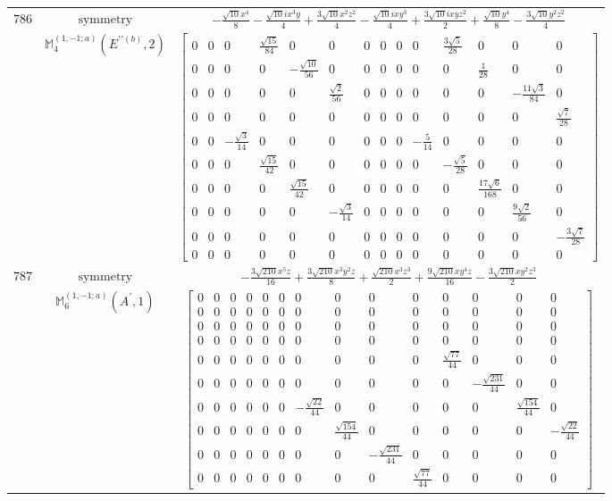 \documentclass[fleqn,8pt,landscape]{jsarticle}
\begin{document}
\begin{longtable}{ccc}
$ 786 $ & $ \text{symmetry} $ & $ - \frac{\sqrt{10} x^{4}}{8} - \frac{\sqrt{10} i x^{3} y}{4} + \frac{3 \sqrt{10} x^{2} z^{2}}{4} - \frac{\sqrt{10} i x y^{3}}{4} + \frac{3 \sqrt{10} i x y z^{2}}{2} + \frac{\sqrt{10} y^{4}}{8} - \frac{3 \sqrt{10} y^{2} z^{2}}{4} $ \\
$  $ & $ \mathbb{M}_{4}^{(1,-1;a)}(E^{\prime\prime(b)},2) $ & $ \begin{bmatrix} 0 & 0 & 0 & \frac{\sqrt{15}}{84} & 0 & 0 & 0 & 0 & 0 & 0 & \frac{3 \sqrt{5}}{28} & 0 & 0 & 0 \\ 0 & 0 & 0 & 0 & - \frac{\sqrt{10}}{56} & 0 & 0 & 0 & 0 & 0 & 0 & \frac{1}{28} & 0 & 0 \\ 0 & 0 & 0 & 0 & 0 & \frac{\sqrt{2}}{56} & 0 & 0 & 0 & 0 & 0 & 0 & - \frac{11 \sqrt{3}}{84} & 0 \\ 0 & 0 & 0 & 0 & 0 & 0 & 0 & 0 & 0 & 0 & 0 & 0 & 0 & \frac{\sqrt{7}}{28} \\ 0 & 0 & - \frac{\sqrt{3}}{14} & 0 & 0 & 0 & 0 & 0 & 0 & - \frac{5}{14} & 0 & 0 & 0 & 0 \\ 0 & 0 & 0 & \frac{\sqrt{15}}{42} & 0 & 0 & 0 & 0 & 0 & 0 & - \frac{\sqrt{5}}{28} & 0 & 0 & 0 \\ 0 & 0 & 0 & 0 & \frac{\sqrt{15}}{42} & 0 & 0 & 0 & 0 & 0 & 0 & \frac{17 \sqrt{6}}{168} & 0 & 0 \\ 0 & 0 & 0 & 0 & 0 & - \frac{\sqrt{3}}{14} & 0 & 0 & 0 & 0 & 0 & 0 & \frac{9 \sqrt{2}}{56} & 0 \\ 0 & 0 & 0 & 0 & 0 & 0 & 0 & 0 & 0 & 0 & 0 & 0 & 0 & - \frac{3 \sqrt{7}}{28} \\ 0 & 0 & 0 & 0 & 0 & 0 & 0 & 0 & 0 & 0 & 0 & 0 & 0 & 0 \end{bmatrix} $ \\ \hline
$ 787 $ & $ \text{symmetry} $ & $ - \frac{3 \sqrt{210} x^{5} z}{16} + \frac{3 \sqrt{210} x^{3} y^{2} z}{8} + \frac{\sqrt{210} x^{3} z^{3}}{2} + \frac{9 \sqrt{210} x y^{4} z}{16} - \frac{3 \sqrt{210} x y^{2} z^{3}}{2} $ \\
$  $ & $ \mathbb{M}_{6}^{(1,-1;a)}(A^{\prime},1) $ & $ \begin{bmatrix} 0 & 0 & 0 & 0 & 0 & 0 & 0 & 0 & 0 & 0 & 0 & 0 & 0 & 0 \\ 0 & 0 & 0 & 0 & 0 & 0 & 0 & 0 & 0 & 0 & 0 & 0 & 0 & 0 \\ 0 & 0 & 0 & 0 & 0 & 0 & 0 & 0 & 0 & 0 & 0 & 0 & 0 & 0 \\ 0 & 0 & 0 & 0 & 0 & 0 & 0 & 0 & 0 & 0 & 0 & 0 & 0 & 0 \\ 0 & 0 & 0 & 0 & 0 & 0 & 0 & 0 & 0 & 0 & \frac{\sqrt{77}}{44} & 0 & 0 & 0 \\ 0 & 0 & 0 & 0 & 0 & 0 & 0 & 0 & 0 & 0 & 0 & - \frac{\sqrt{231}}{44} & 0 & 0 \\ 0 & 0 & 0 & 0 & 0 & 0 & - \frac{\sqrt{22}}{44} & 0 & 0 & 0 & 0 & 0 & \frac{\sqrt{154}}{44} & 0 \\ 0 & 0 & 0 & 0 & 0 & 0 & 0 & \frac{\sqrt{154}}{44} & 0 & 0 & 0 & 0 & 0 & - \frac{\sqrt{22}}{44} \\ 0 & 0 & 0 & 0 & 0 & 0 & 0 & 0 & - \frac{\sqrt{231}}{44} & 0 & 0 & 0 & 0 & 0 \\ 0 & 0 & 0 & 0 & 0 & 0 & 0 & 0 & 0 & \frac{\sqrt{77}}{44} & 0 & 0 & 0 & 0 \end{bmatrix} $ \\ \hline

\end{longtable}
\end{document}
